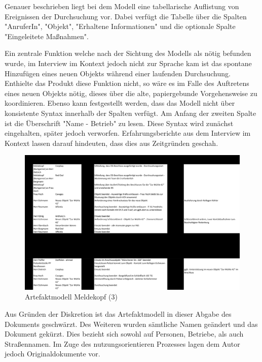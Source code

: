 Genauer beschrieben liegt bei dem Modell eine tabellarische Auflistung von Ereignissen der Durchsuchung vor.
Dabei verfügt die Tabelle über die Spalten "AnruferIn", "Objekt", "Erhaltene Informationen" und die optionale Spalte "Eingeleitete Maßnahmen".

Ein zentrale Funktion welche nach der Sichtung des Modells als nötig befunden wurde, im Interview im Kontext jedoch nicht zur Sprache kam ist das spontane Hinzufügen eines neuen Objekts während einer laufenden Durchsuchung.
Enthielte das Produkt diese Funktion nicht, so wäre es im Falle des Auftretens eines neuen Objekts nötig, dieses über die alte, papiergebunde Vorgehensweise zu koordinieren.
Ebenso kann festgestellt werden, dass das Modell nicht über konsistente Syntax innerhalb der Spalten verfügt. 
Am Anfang der zweiten Spalte ist die Überschrift "Name - Betrieb" zu lesen.
Diese Syntax wird zunächst eingehalten, später jedoch verworfen.
Erfahrungsberichte aus dem Interview im Kontext lassen darauf hindeuten, dass dies aus Zeitgründen geschah.

\begin{figure}[htp]
    \centering
    \includegraphics[width=.75\textwidth]{images/0-Artefaktmodell/Chronologie_Meldekopf-3.png}
    \caption{Artefaktmodell Meldekopf (3)}
    \label{fig:chrono3}
\end{figure}

Aus Gründen der Diskretion ist das Artefaktmodell in dieser Abgabe des Dokuments geschwärzt.
Des Weiteren wurden sämtliche Namen geändert und das Dokument gekürzt.
Dies bezieht sich sowohl auf Personen, Betriebe, als auch Straßennamen.
Im Zuge des nutzungsorientieren Prozesses lagen dem Autor jedoch Originaldokumente vor.
